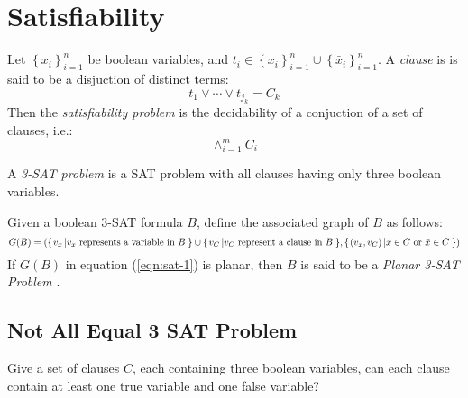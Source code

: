 \section{Satisfiability}
\begin{prob}\label{prob:Satisfiability-1}%
Let $\left\lbrace x_i \right\rbrace_{i=1}^{n} $ be boolean variables, and $t_i \in \left\lbrace 
x_i\right\rbrace_{i=1}^{n}  \cup \left\lbrace \bar{x}_i\right\rbrace_{i=1}^{n}   $.  A 
\textit{clause} is is said to be a disjuction of distinct terms:
$$
t_1 \vee \cdots \vee t_{j_k} = C_k
$$
Then the \textit{satisfiability problem} is the decidability of a conjuction of a set of clauses, 
i.e.:
$$ \wedge_{i=1}^m C_i$$
\end{prob} \cite{skiena2009algorithm}
A \textit{3-SAT problem} is a SAT problem with all clauses having only three boolean variables. 
\begin{definition}\label{def:Satisfiability-2}
Given a boolean 3-SAT formula $B$, define the associated graph of $B$ as follows:  
\begin{equation}\label{eqn:sat-1}
G(B) = \left({\left\lbrace \left. v_x \left\vert v_x\text{ represents a variable in }B \right.\right.\right\rbrace } \cup {\left\lbrace \left. v_C \left\vert v_C\text{ represent a 
clause in }B \right.\right.\right\rbrace }  , {\left\lbrace \left. \left( v_x, v_C\right)  \left\vert x \in C \text{ or } \bar{x} \in C \right.\right.\right\rbrace }  \right) 
\end{equation} 
If $G(B)$ in equation (\ref{eqn:sat-1}) is planar, then $B$ is said to be a \textit{Planar 3-SAT 
Problem} \cite{mulzer2008minimum}.
\end{definition}
\subsection{Not All Equal 3 SAT Problem}
\begin{prob}\label{prob:Satisfiability-2}%
Give a set of clauses $C$, each containing three boolean variables, can each clause contain at 
least one true variable and one false variable?
\end{prob}
